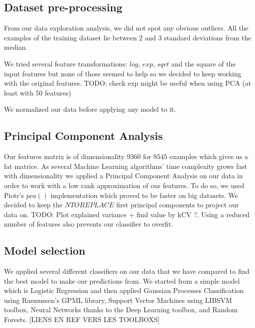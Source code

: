 \documentclass{article}
\begin{document}
    \subsection{Dataset pre-processing}
  From our data exploration analysis, we did not spot any obvious outliers. All the examples of the training dataset lie between 2 and 3 standard deviations from the median.
  
  We tried several feature transformations: $log$, $exp$, $sqrt$ and the square of the input features but none of those seemed to help so we decided to keep working with the original features. 
  TODO: check exp might be useful when using PCA (at least with 50 features)
  
  We normalized our data before applying any model to it.
  
  \subsection{Principal Component Analysis}
  Our features matrix is of dimensionality $9360$ for $8545$ examples which gives us a fat matrice. As several Machine Learning algorithms' time complexity grows fast with dimensionality we applied a Principal Component Analysis on our data in order to work with a low rank approximation of our features. To do so, we used Piotr's $pca()$ implementation which proved to be faster on big datasets. We decided to keep the $NTOREPLACE$ first principal components to project our data on. TODO: Plot explained variance + find value by kCV ?.
  Using a reduced number of features also prevents our classifier to overfit.
  
   \subsection{Model selection}
   We applied several different classifiers on our data that we have compared to find the best model to make our predictions from. We started from a simple model which is Logistic Regression and then applied Gaussian Processes Classification using Rasmussen's GPML library, Support Vector Machines using LIBSVM toolbox, Neural Networks thanks to the Deep Learning toolbox, and Random Forests. [LIENS EN REF VERS LES TOOLBOXS]
   
\end{document}
